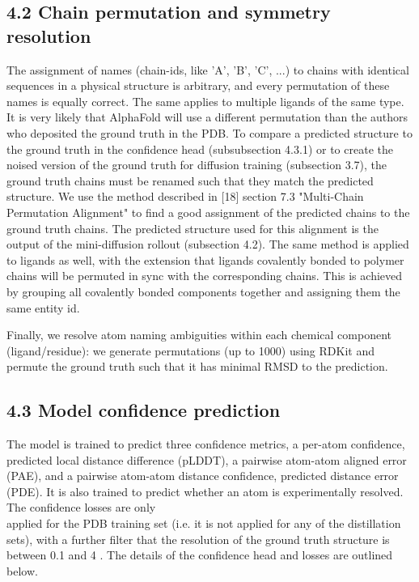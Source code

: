 \documentclass[10pt]{article}
\begin{document}
\subsection*{4.2 Chain permutation and symmetry resolution}
The assignment of names (chain-ids, like 'A', 'B', 'C', ...) to chains with identical sequences in a physical structure is arbitrary, and every permutation of these names is equally correct. The same applies to multiple ligands of the same type. It is very likely that AlphaFold will use a different permutation than the authors who deposited the ground truth in the PDB. To compare a predicted structure to the ground truth in the confidence head (subsubsection 4.3.1) or to create the noised version of the ground truth for diffusion training (subsection 3.7), the ground truth chains must be renamed such that they match the predicted structure. We use the method described in [18] section 7.3 "Multi-Chain Permutation Alignment" to find a good assignment of the predicted chains to the ground truth chains. The predicted structure used for this alignment is the output of the mini-diffusion rollout (subsection 4.2). The same method is applied to ligands as well, with the extension that ligands covalently bonded to polymer chains will be permuted in sync with the corresponding chains. This is achieved by grouping all covalently bonded components together and assigning them the same entity id.

Finally, we resolve atom naming ambiguities within each chemical component (ligand/residue): we generate permutations (up to 1000) using RDKit and permute the ground truth such that it has minimal RMSD to the prediction.

\subsection*{4.3 Model confidence prediction}
The model is trained to predict three confidence metrics, a per-atom confidence, predicted local distance difference (pLDDT), a pairwise atom-atom aligned error (PAE), and a pairwise atom-atom distance confidence, predicted distance error (PDE). It is also trained to predict whether an atom is experimentally resolved. The confidence losses are only\\
applied for the PDB training set (i.e. it is not applied for any of the distillation sets), with a further filter that the resolution of the ground truth structure is between 0.1 and 4 . The details of the confidence head and losses are outlined below.
\end{document}
